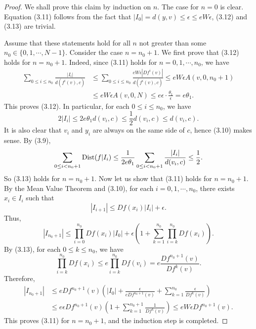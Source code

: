 \documentclass[11pt,oneside]{article}
\theoremstyle{plain}
\numberwithin{equation}{section}
\numberwithin{figure}{section}
\numberwithin{table}{section}
\begin{document}
\begin{proof}
We shall prove this claim by induction on $n$. The case for $n=0$ is clear. Equation (3.11) follows from the fact that $|I_0| = d(y, v) \leq \epsilon \leq e W \epsilon$, (3.12) and (3.13) are trivial. 


Assume that these statements hold for all $n$ not greater than some $n_0 \in \{ 0, 1, \cdots, N-1\}$. Consider the case $n=n_0+1$. We first prove that (3.12) holds for $n=n_0+1$. Indeed, since (3.11) holds for $n=0, 1, \cdots, n_0$, we have
\begin{align*}
\sum_{0 \leq i \leq n_0} \frac{|I_i|}{d(f^i(v), c)}& \leq \sum_{0 \leq i \leq n_0} \frac{eW\epsilon |Df^i(v)|}{d(f^i(v), c)} \leq eW\epsilon A(v, 0, n_0+1)\\
& \leq eW\epsilon A(v, 0, N) \leq e \epsilon \cdot \frac{\theta_1}{\epsilon } = e \theta_1.
\end{align*}
This proves (3.12). In particular, for each $0 \leq i \leq n_0$, we have
\[
2|I_i| \leq 2e \theta_1 d(v_i, c) \leq \frac{1}{2} d(v_i, c) \leq d(v_i, c).
\]
It is also clear that $v_i$ and $y_i$ are always on the same side of $c$, hence (3.10) makes sense. By (3.9), 
\[
\sum_{0 \leq i <n_0+1} {\rm Dist}(f | I_i) \leq \frac{1}{2e\theta_1} \sum_{0 \leq i <n_0+1} \frac{|I_i|}{d(v_i, c)} \leq \frac{1}{2}.
\]
So (3.13) holds for $n = n_0+1$. Now let us show that (3.11) holds for $n = n_0 + 1$. By the Mean Value Theorem and (3.10), for each $i=0, 1, \cdots, n_0$, there exists $x_i \in I_i$ such that
\[
|I_{i+1}| \leq Df(x_i) |I_i| + \epsilon.
\]
Thus,
\[
| I_{n_0+1} | \leq \prod_{i=0}^{n_0} Df(x_i) |I_0| + \epsilon \left( 1 + \sum_{k=1}^{n_0} \prod_{i=k}^{n_0} Df(x_i)\right).
\]
By (3.13), for each $0 \leq k \leq n_0$, we have
\[
\prod_{i=k}^{n_0} Df(x_i) \leq e\prod_{i=k}^{n_0} Df(v_i) = e \frac{Df^{n_0+1}(v)}{Df^k(v)}.
\]
Therefore, 
\begin{align*}
| I_{n_0+1}  |& \leq e Df^{n_0+1}(v) \left( |I_0| + \frac{\epsilon}{e Df^{n_0+1}(v)} + \sum_{k=1}^{n_0} \frac{\epsilon}{Df^k(v)} \right) \\
& \leq e \epsilon  Df^{n_0+1}(v)\left( 1 + \sum_{k=1}^{n_0+1} \frac{1}{Df^k(v)} \right) \leq e W \epsilon  Df^{n_0+1}(v).
\end{align*}
This proves (3.11) for $n = n_0 + 1$, and the induction step is completed.



\end{proof}
\end{document}
